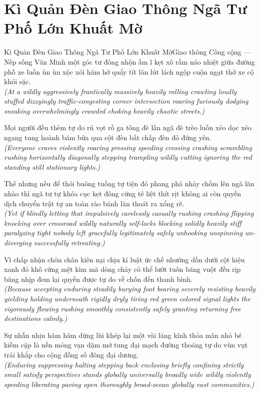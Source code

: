\section{Kì Quản Đèn Giao Thông Ngã Tư Phố Lớn Khuất Mờ}
\begin{truyen}{Kì Quản Đèn Giao Thông Ngã Tư Phố Lớn Khuất Mờ}{Giao thông Công cộng --- Nếp sống Văn Minh}
 một góc tư đông nhộn ầm ĩ kẹt xô rầm náo nhiệt giữa đường phố xe luồn ùn ùn xộc xói hăm hở quẩy tít lăn lút lách ngộp cuộn ngạt thở xe cộ khói sặc.\\[4pt]
\textit{(At a wildly aggressively frantically massively heavily rolling crawling loudly stuffed dizzyingly traffic-congesting corner intersection roaring furiously dodging sneaking overwhelmingly crowded choking heavily chaotic streets.)}

Mọi người đều thèm tự do rú vọt rồ ga tông đè lấn ngã đè trèo luồn xéo dọc xéo ngang tung hoành băm bửa qua cột đèn bất chấp đèn đỏ đứng yên.\\[4pt]
\textit{(Everyone craves violently roaring pressing speeding crossing crashing scrambling rushing horizontally diagonally stepping trampling wildly cutting ignoring the red standing still stationary lights.)}

Thế nhưng nếu để thói buông tuồng tự tiện đó phang phá nhảy chồm lên ngã lăn nhào thì ngã tư tự khóa cục kẹt đông cứng tê liệt thít rịt không ai còn quyền dịch chuyển trật tự an toàn rảo bánh lăn thoát ra xổng rẽ.\\[4pt]
\textit{(Yet if blindly letting that impulsively carelessly casually rushing crashing flipping knocking over crossroad wildly naturally self-locks blocking solidly heavily stiff paralyzing tight nobody left gracefully legitimately safely unhooking unspinning un-diverging successfully retreating.)}

Vì chấp nhận chôn chân kiên nại chịu kỉ luật ức chế nhường dồn dưới cột hiệu xanh đỏ khô cứng mệt kìm mà dòng chảy có thể lướt tuôn băng vuột đều rịp băng nhịp đem lại quyền được tự do về chốn đến thanh bình.\\[4pt]
\textit{(Because accepting enduring steadily burying foot bearing severely resisting heavily yielding holding underneath rigidly dryly tiring red green colored signal lights the vigorously flowing rushing smoothly consistently safely granting returning free destinations calmly.)}

\end{truyen}
\begin{baihoc}
  Sự nhẫn nhịn hãm hãm dừng lùi khép lại một vài lăng kính thỏa mãn nhỏ bé kiềm cặp là nền móng vạn dặm mở tung đại mạch đường thoáng tự do vùn vụt trải khắp cho cộng đồng số đông đại dương.\\[4pt]
  \textit{(Enduring suppressing halting stepping back enclosing briefly confining strictly small satisfy perspectives stands globally universally broadly wide wildly violently speeding liberating paving open thoroughly broad-ocean globally vast communities.)}
\end{baihoc}
